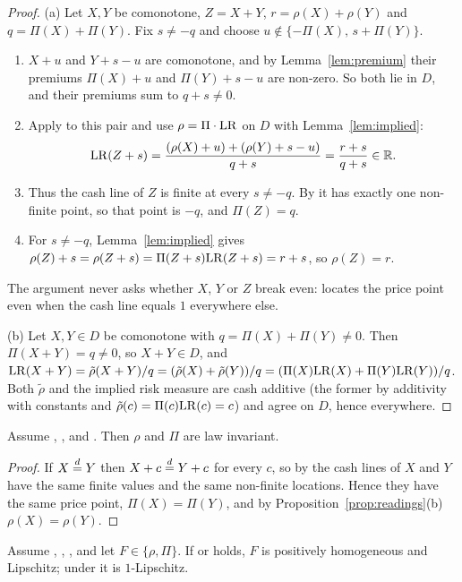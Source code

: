 \begin{proof}
(a) Let $X,Y$ be comonotone, $Z=X+Y$, $r=\rho(X)+\rho(Y)$ and $q=\Pi(X)+\Pi(Y)$. Fix $s\neq-q$ and choose
$u\notin\{-\Pi(X),\,s+\Pi(Y)\}$.
\begin{enumerate}[label=(\arabic*),nosep]
\item $X+u$ and $Y+s-u$ are comonotone, and by Lemma~\ref{lem:premium} their premiums $\Pi(X)+u$ and
  $\Pi(Y)+s-u$ are non-zero. So both lie in $D$, and their premiums sum to $q+s\neq0$.
\item Apply \axCM{} to this pair and use $\rho=\Pi\cdot\mathrm{LR}$ on $D$ with Lemma~\ref{lem:implied}:
  \[
  \mathrm{LR}(Z+s)=\frac{(\rho(X)+u)+(\rho(Y)+s-u)}{q+s}=\frac{r+s}{q+s}\in\mathbb R .
  \]
\item Thus the cash line of $Z$ is finite at every $s\neq-q$. By \axP{} it has exactly one non-finite
  point, so that point is $-q$, and $\Pi(Z)=q$.
\item For $s\ne-q$, Lemma~\ref{lem:implied} gives $\rho(Z)+s=\rho(Z+s)=\Pi(Z+s)\mathrm{LR}(Z+s)=r+s$, so $\rho(Z)=r$.
\end{enumerate}
The argument never asks whether $X$, $Y$ or $Z$ break even: \axP{} locates the price point even when the
cash line equals $1$ everywhere else.

(b) Let $X,Y\in D$ be comonotone with $q=\Pi(X)+\Pi(Y)\ne0$. Then $\Pi(X+Y)=q\ne0$, so $X+Y\in D$, and
$\mathrm{LR}(X+Y)=\tilde\rho(X+Y)/q=(\tilde\rho(X)+\tilde\rho(Y))/q=(\Pi(X)\mathrm{LR}(X)+\Pi(Y)\mathrm{LR}(Y))/q$. Both $\tilde\rho$ and
the implied risk measure are cash additive (the former by additivity with constants and $\tilde\rho(c)=\Pi(c)\mathrm{LR}(c)=c$)
and agree on $D$, hence everywhere. \qedhere
\end{proof}

\begin{lemma}\label{lem:LI}
Assume \axP, \axN, \axCM{} and \axLI. Then $\rho$ and $\Pi$ are law invariant.
\end{lemma}

\begin{proof}
If $X\overset{d}{=} Y$ then $X+c\overset{d}{=} Y+c$ for every $c$, so by \axLI{} the cash lines of $X$ and $Y$ have the same finite
values and the same non-finite locations. Hence they have the same price point, $\Pi(X)=\Pi(Y)$, and by Proposition~\ref{prop:readings}(b) $\rho(X)=\rho(Y)$. \qedhere
\end{proof}

\begin{lemma}\label{lem:cashlip}
Assume \axP, \axN, \axCM, and let $F\in\{\rho,\Pi\}$. If \axRC{} or \axRM{} holds, $F$ is positively homogeneous
and Lipschitz; under \axRM{} it is $1$-Lipschitz.
\end{lemma}

